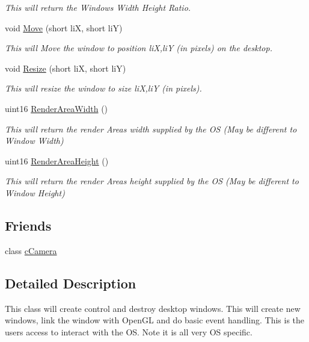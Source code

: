 \begin{DoxyCompactItemize}
\begin{DoxyCompactList}\small\item\em This will return the Windows Width Height Ratio. \end{DoxyCompactList}\item 
\hypertarget{classc_window_a11e2c0045091c6e6826361f8c68b2022}{
void \hyperlink{classc_window_a11e2c0045091c6e6826361f8c68b2022}{Move} (short liX, short liY)}
\label{classc_window_a11e2c0045091c6e6826361f8c68b2022}

\begin{DoxyCompactList}\small\item\em This will Move the window to position liX,liY (in pixels) on the desktop. \end{DoxyCompactList}\item 
\hypertarget{classc_window_a38129c91195b1e7f5711aecc1ffb4d77}{
void \hyperlink{classc_window_a38129c91195b1e7f5711aecc1ffb4d77}{Resize} (short liX, short liY)}
\label{classc_window_a38129c91195b1e7f5711aecc1ffb4d77}

\begin{DoxyCompactList}\small\item\em This will resize the window to size liX,liY (in pixels). \end{DoxyCompactList}\item 
\hypertarget{classc_window_aa17184bf0642dffb87bb001adfb52d37}{
uint16 \hyperlink{classc_window_aa17184bf0642dffb87bb001adfb52d37}{RenderAreaWidth} ()}
\label{classc_window_aa17184bf0642dffb87bb001adfb52d37}

\begin{DoxyCompactList}\small\item\em This will return the render Areas width supplied by the OS (May be different to Window Width) \end{DoxyCompactList}\item 
\hypertarget{classc_window_a984e0c37a6444f9910dfe7269276eac8}{
uint16 \hyperlink{classc_window_a984e0c37a6444f9910dfe7269276eac8}{RenderAreaHeight} ()}
\label{classc_window_a984e0c37a6444f9910dfe7269276eac8}

\begin{DoxyCompactList}\small\item\em This will return the render Areas height supplied by the OS (May be different to Window Height) \end{DoxyCompactList}\end{DoxyCompactItemize}
\subsection*{Friends}
\begin{DoxyCompactItemize}
\item 
\hypertarget{classc_window_a930db2797d94f26b57e430e155ad81ba}{
class \hyperlink{classc_window_a930db2797d94f26b57e430e155ad81ba}{cCamera}}
\label{classc_window_a930db2797d94f26b57e430e155ad81ba}

\end{DoxyCompactItemize}


\subsection{Detailed Description}
This class will create control and destroy desktop windows. This will create new windows, link the window with OpenGL and do basic event handling. This is the users access to interact with the OS. Note it is all very OS specific. 